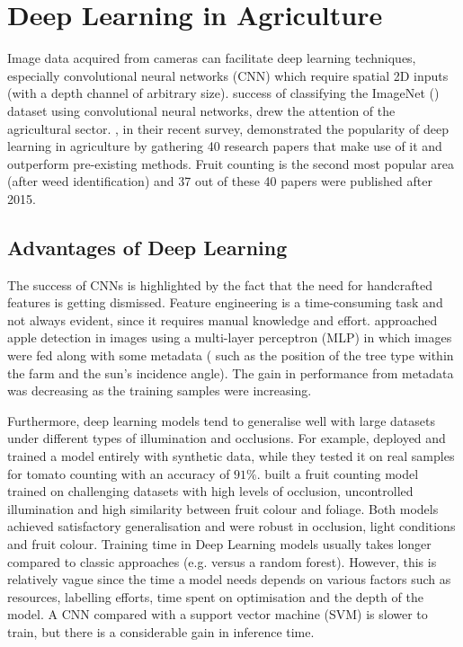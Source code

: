 \section{Deep Learning in Agriculture}
Image data acquired from cameras can facilitate deep learning techniques, especially convolutional neural networks (CNN) which require spatial 2D inputs (with a depth channel of arbitrary size). \cite{krizhevsky2012imagenet} success of classifying the ImageNet (\cite{deng2009imagenet}) dataset using convolutional neural networks, drew the attention of the agricultural sector. \cite{kamilaris2018deep}, in their recent survey, demonstrated the popularity of deep learning in agriculture by gathering 40 research papers that make use of it and outperform pre-existing methods. Fruit counting is the second most popular area (after weed identification) and 37 out of these 40 papers were published after 2015. 

\subsection{Advantages of Deep Learning}
The success of CNNs is highlighted by the fact that the need for handcrafted features is getting dismissed. Feature engineering is a time-consuming task and not always evident, since it requires manual knowledge and effort. \cite{bargoti2016image} approached apple detection in images using a multi-layer perceptron (MLP) in which images were fed along with some metadata ( such as the position of the tree type within the farm and the sun's incidence angle). The gain in performance from metadata was decreasing as the training samples were increasing. 

Furthermore, deep learning models tend to generalise well with large datasets under different types of illumination and occlusions. For example, \cite{rahnemoonfar2017deep} deployed and trained a model entirely with synthetic data, while they tested it on real samples for tomato counting with an accuracy of $91\%$. \cite{chen2017counting} built a fruit counting model trained on challenging datasets with high levels of occlusion, uncontrolled illumination and high similarity between fruit colour and foliage. Both models achieved satisfactory generalisation and were robust in occlusion, light conditions and fruit colour. Training time in Deep Learning models usually takes longer compared to classic approaches (e.g. versus a random forest). However, this is relatively vague since the time a model needs depends on various factors such as resources,  labelling efforts, time spent on optimisation and the depth of the model. A CNN compared with a support vector machine (SVM) is slower to train, but there is a considerable gain in inference time.

